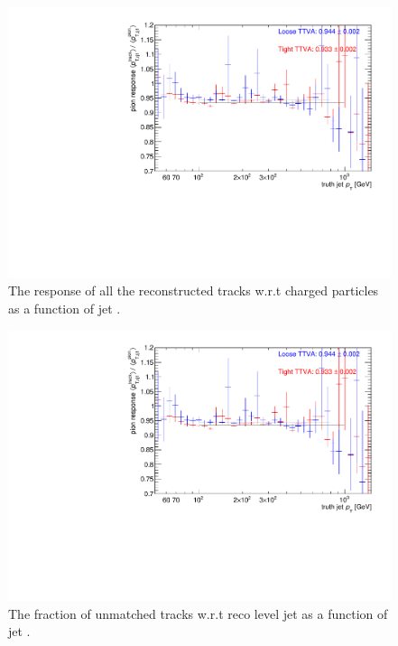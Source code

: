 \begin{figure}
\centering
\includegraphics[scale=0.3, page=7]{figures/jet_comp_study_powheg_Tight_MultiplicityFraction_withLooseandTight.pdf}
\caption {The response of  all the reconstructed tracks w.r.t charged particles as a function of jet \pT.}
\label{fig:track jet response}
\end{figure}

\begin{figure}
\centering
\includegraphics[scale=0.3, page=8]{figures/jet_comp_study_powheg_Tight_MultiplicityFraction_withLooseandTight.pdf}
\caption {The fraction of unmatched tracks w.r.t reco level jet as a function of jet \pT.}
\label{fig:unmatched tracks fraction}
\end{figure}



